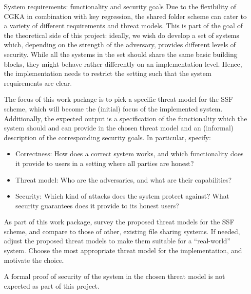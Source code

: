 \documentclass[E]{BAMASA}
\begin{document}
\begin{workpackage}{System requirements: functionality and security goals}\label{wp:system-reqs}
    Due to the flexibility of CGKA in combination with key regression, 
    the shared folder scheme can cater to a variety of different requirements and threat models.
    This is part of the goal of the theoretical side of this project: 
    ideally, we wish do develop a set of systems which, depending on the strength of the adversary, provides different levels of security.
    While all the systems in the set should share the same basic building blocks, they might behave rather differently on an implementation level. 
    Hence, the implementation needs to restrict the setting such that the system requirements are clear.
    
    The focus of this work package is to pick a specific threat model for the SSF scheme, which will become the (initial) focus of the implemented system.
    Additionally, the expected output is a specification of the functionality which the system should and can provide in the chosen threat model and an (informal) description of the corresponding security goals.
    In particular, specify:
    \begin{itemize}
        \item Correctness: How does a correct system works, and which functionality does it provide to users in a setting where all parties are honest?
        \item Threat model: Who are the adversaries, and what are their capabilities?
        \item Security: Which kind of attacks does the system protect against? What security guarantees does it provide to its honest users?
    \end{itemize}
    As part of this work package, survey the proposed threat models for the SSF scheme, and compare to those of other, existing file sharing systems.
    If needed, adjust the proposed threat models to make them suitable for a ``real-world'' system.
    Choose the most appropriate threat model for the implementation, and motivate the choice.
    
    A formal proof of security of the system in the chosen threat model is not expected as part of this project.
\end{workpackage}
\end{document}
